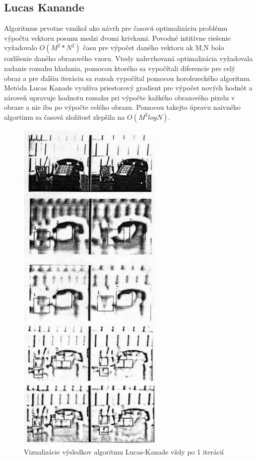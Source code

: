 \subsection{Lucas Kanande}
Algoritmus prvotne vznikol ako návrh pre časovú optimalizáciu problému výpočtu vektoru posunu medzi dvomi krivkami.
Povodné intitívne riešenie vyžadovalo \begin{math} O(M^2 * N^2) \end{math} času pre výpočet daného vektoru ak M,N bolo rozlíšenie daného obrazového vzoru.
Vtedy nahvrhovaná optimalizácia vyžadovala zadanie rozsahu hladania, pomocou ktorého sa vypočítali diferencie pre celý obraz a pre ďalšiu iteráciu sa rozsah vypočítal pomocou horolezeckého algoritmu.
Metóda Lucas Kanade využíva priestorový gradient pre výpočet nových hodnôt a zároveň upravuje hodnotu rozsahu pri výpočte kažkého obrazového pixelu v obraze a nie iba po výpočte celého obrazu.
Pomocou takejto úpravu naivného algortimu sa časová zložitosť zlepšila na \begin{math} O(M^2 log N) \end{math}\cite{lucas-kanade}.

\begin{figure}[H]
  \centering
  \includegraphics[width=7cm]{pics/lukas-kanade.jpg}
  \caption{Vizualizácie výsledkov algoritmu Lucas-Kanade vždy po 1 iterácií\cite{lucas-kanade}}
\end{figure}
\vspace{10mm}

